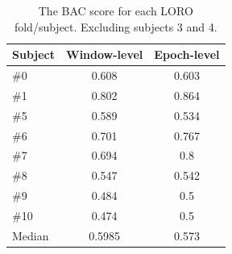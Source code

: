         \begin{table}[h]
            \centering
            \begin{tabular}{lcc}
            \toprule
                \textbf{Subject} & \textbf{Window-level} & \textbf{Epoch-level} \\
            \midrule
            \#0  & 0.608  & 0.603 \\
            \#1  & 0.802  & 0.864 \\
            \#5  & 0.589  & 0.534 \\
            \#6  & 0.701  & 0.767 \\
            \#7  & 0.694  & 0.8   \\
            \#8  & 0.547  & 0.542 \\
            \#9  & 0.484  & 0.5   \\
            \#10 & 0.474  & 0.5   \\
            \midrule
            Median & 0.5985 & 0.573 \\
            \bottomrule
            \end{tabular}
            \caption{The BAC score for each LORO fold/subject. Excluding subjects 3 and 4.}\label{table:bac-all}
        \end{table}


